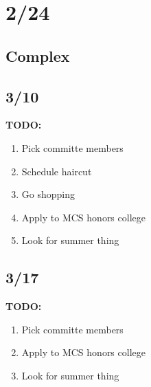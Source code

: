 \documentclass[11pt]{article}
\theoremstyle{remark}
\begin{document}
\section{2/24}

\subsection{Complex}


\subsection{3/10}

\textbf{TODO:}

\begin{enumerate}
	\item Pick committe members
	\item Schedule haircut
	\item Go shopping
	\item Apply to MCS honors college
	\item Look for summer thing
\end{enumerate}

\subsection{3/17}

\textbf{TODO:}

\begin{enumerate}
	\item Pick committe members
	\item Apply to MCS honors college
	\item Look for summer thing
\end{enumerate}


	
\end{document}

